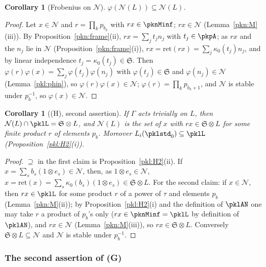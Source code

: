 \documentclass[10pt]{amsart}
\newtheorem{corollary}[theorem]{Corollary}
\theoremstyle{definition}
\theoremstyle{remark}
\begin{document}
\begin{corollary}[Frobenius on $\mathcal N$]\label{pkl:Phi}
$\varphi(\mathcal N(L))\subseteq\mathcal N(L)$.
\end{corollary}

\begin{proof}
Let $x\in\mathcal N$ and $r=\prod_kp_{b_k}$ with $rx\in\pknMinf$; $rx\in\mathcal N$ (Lemma~\ref{pkn:M}(iii)). By
Proposition~\ref{pkn:frame}(ii), $rx=\sum_jt_jn_j$ with $t_j\in\pkpA$; as $rx$ and the $n_j$ lie in $\mathcal N$
(Proposition~\ref{pkn:frame}(i)), $rx=\mathrm{ret}(rx)=\sum_j\kappa_0(t_j)n_j$, and by linear independence
$t_j=\kappa_0(t_j)\in\mathfrak S$. Then $\varphi(r)\varphi(x)=\sum_j\varphi(t_j)\varphi(n_j)$ with $\varphi(t_j)\in\mathfrak S$
and $\varphi(n_j)\in\mathcal N$ (Lemma~\ref{pkl:phin}), so $\varphi(r)\varphi(x)\in\mathcal N$; $\varphi(r)=\prod_kp_{b_k+1}$,
and $\mathcal N$ is stable under $p_b^{-1}$, so $\varphi(x)\in\mathcal N$.
\end{proof}

\begin{corollary}[(H), second assertion]\label{pkl:H3}
If $\Gamma$ acts trivially on $L$, then $\mathcal N(L)\cap\pklL=\mathfrak S\otimes L$, and $\mathcal N(L)$ is the set of
$x$ with $rx\in\mathfrak S\otimes L$ for some finite product $r$ of elements $p_b$. Moreover
$L_i(\pklstd_0)\subseteq\pklL$ (Proposition~\ref{pkl:H2}(i)).
\end{corollary}

\begin{proof}
$\supseteq$ in the first claim is Proposition~\ref{pkl:H2}(ii). If $x=\sum_sb_s(1\otimes e_s)\in\mathcal N$, then, as
$1\otimes e_s\in\mathcal N$, $x=\mathrm{ret}(x)=\sum_s\kappa_0(b_s)(1\otimes e_s)\in\mathfrak S\otimes L$. For the second
claim: if $x\in\mathcal N$, then $rx\in\pklL$ for some product $r$ of a power of $\tau$ and elements $p_b$
(Lemma~\ref{pkn:M}(ii)); by Proposition~\ref{pkl:H2}(i) and the definition of $\pklAN$ one may take $r$ a product of
$p_b$'s only ($rx\in\pknMinf=\pklL$ by definition of $\pklAN$), and $rx\in\mathcal N$ (Lemma~\ref{pkn:M}(iii)), so
$rx\in\mathfrak S\otimes L$. Conversely $\mathfrak S\otimes L\subseteq\mathcal N$ and $\mathcal N$ is stable under
$p_b^{-1}$.
\end{proof}

\subsubsection{The second assertion of (G)}\label{pkl:ss-open}
\end{document}

